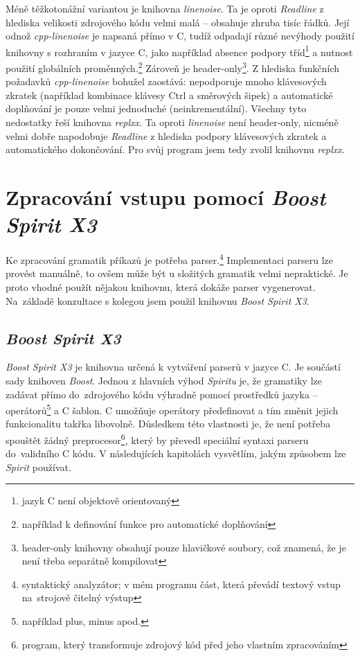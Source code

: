 \documentclass[thesis=B,czech,hidelinks]{FITthesis}[2019/03/06]
\newcommand{\Rplus}{\protect\hspace{-.1em}\protect\raisebox{.35ex}{\smaller{\smaller\textbf{+}}}}
\newcommand{\Cpp}{\mbox{C\Rplus\Rplus}\xspace}
\begin{document}
Méně těžkotonážní variantou je knihovna \textit{linenoise}. Ta je oproti \textit{Readline} z hlediska velikosti zdrojového kódu velmi malá -- obsahuje zhruba tisíc řádků. Její odnož \textit{cpp-linenoise} je napsaná přímo v \Cpp{}, tudíž odpadají různé nevýhody použití knihovny s rozhraním v jazyce C, jako například absence podpory tříd\footnote{jazyk C není objektově orientovaný} a nutnost použití globálních proměnných.\footnote{například k definování funkce pro automatické doplňování} Zároveň je header-only\footnote{header-only knihovny obsahují pouze hlavičkové soubory, což znamená, že je není třeba separátně kompilovat}. Z hlediska funkčních požadavků \textit{cpp-linenoise} bohužel zaostává: nepodporuje mnoho klávesových zkratek (například kombinace klávesy Ctrl a směrových šipek) a automatické doplňování je pouze velmi jednoduché (neinkrementální). Všechny tyto nedostatky řeší knihovna \textit{replxx}. Ta oproti \textit{linenoise} není header-only, nicméně velmi dobře napodobuje \textit{Readline} z hlediska podpory klávesových zkratek a automatického dokončování. Pro svůj program jsem tedy zvolil knihovnu \textit{replxx}.

\section{Zpracování vstupu pomocí \textit{Boost Spirit X3}}\label{spirit:intro}
Ke zpracování gramatik příkazů je potřeba parser.\footnote{syntaktický analyzátor; v mém programu část, která převádí textový vstup na~strojově čitelný výstup} Implementaci parseru lze provést manuálně, to ovšem může být u složitých gramatik velmi nepraktické. Je proto vhodné použít nějakou knihovnu, která dokáže parser vygenerovat. Na~základě konzultace s kolegou jsem použil knihovnu \textit{Boost Spirit X3}.

\subsection{\textit{Boost Spirit X3}}
\textit{Boost Spirit X3} je knihovna určená k vytváření parserů v jazyce \Cpp{}. Je součástí sady knihoven \textit{Boost}. Jednou z hlavních výhod \textit{Spiritu} je, že gramatiky lze zadávat přímo do~zdrojového kódu výhradně pomocí prostředků jazyka -- operátorů\footnote{například plus, minus apod.} a \Cpp{} šablon. \Cpp{} umožňuje operátory předefinovat a tím změnit jejich funkcionalitu takřka libovolně. Důsledkem této vlastnosti je, že není potřeba spouštět žádný preprocesor\footnote{program, který transformuje zdrojový kód před jeho vlastním zpracováním}, který by převedl speciální syntaxi parseru do~validního \Cpp{} kódu. V následujících kapitolách vysvětlím, jakým způsobem lze \textit{Spirit} používat.
\end{document}
